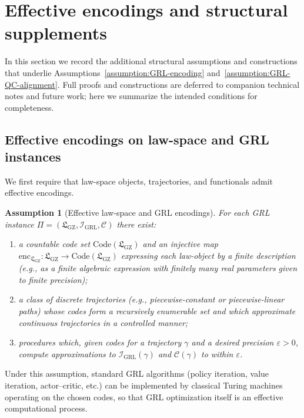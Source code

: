\documentclass[11pt]{book}
\newcommand{\GZLS}{\ensuremath{\mathfrak{L}_{\mathrm{GZ}}}}
\theoremstyle{plain}
\newtheorem{assumption}[theorem]{Assumption}
\theoremstyle{definition}
\theoremstyle{remark}
\begin{document}
\section{Effective encodings and structural supplements}

In this section we record the additional structural assumptions and
constructions that underlie
Assumptions~\ref{assumption:GRL-encoding}
and~\ref{assumption:GRL-QC-alignment}. Full proofs and constructions
are deferred to companion technical notes and future work; here we
summarize the intended conditions for completeness.

\subsection{Effective encodings on law-space and GRL instances}

We first require that law-space objects, trajectories, and functionals
admit effective encodings.

\begin{assumption}[Effective law-space and GRL encodings]
For each GRL instance
$\Pi = (\GZLS,\mathcal{I}_{\mathrm{GRL}},\mathcal{C})$
there exist:
\begin{enumerate}[label=(\roman*)]
  \item a countable code set $\mathrm{Code}(\GZLS)$ and an injective
        map $\mathrm{enc}_{\GZLS}:\GZLS\to\mathrm{Code}(\GZLS)$
        expressing each law-object by a finite description
        (e.g., as a finite algebraic expression with finitely many
        real parameters given to finite precision);
  \item a class of discrete trajectories (e.g., piecewise-constant or
        piecewise-linear paths) whose codes form a recursively
        enumerable set and which approximate continuous trajectories
        in a controlled manner;
  \item procedures which, given codes for a trajectory $\gamma$ and a
        desired precision $\varepsilon>0$, compute approximations to
        $\mathcal{I}_{\mathrm{GRL}}(\gamma)$ and
        $\mathcal{C}(\gamma)$ to within $\varepsilon$.
\end{enumerate}
\end{assumption}

Under this assumption, standard GRL algorithms (policy iteration,
value iteration, actor--critic, etc.) can be implemented by classical
Turing machines operating on the chosen codes, so that GRL optimization
itself is an effective computational process.
\end{document}
